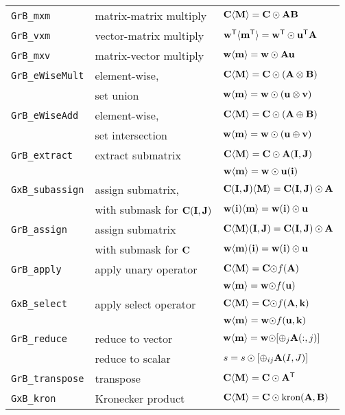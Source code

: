 \documentclass[12pt]{article}
\begin{document}
\vspace{0.2in}
{\small
\begin{tabular}{lll}
\hline
\verb'GrB_mxm'       & matrix-matrix multiply  & ${\bf C \langle M \rangle = C \odot AB}$ \\
\verb'GrB_vxm'       & vector-matrix multiply  & ${\bf w^{\sf T}\langle m^{\sf T}\rangle = w^{\sf T}\odot u^{\sf T}A}$ \\
\verb'GrB_mxv'       & matrix-vector multiply  & ${\bf w \langle m \rangle = w \odot Au}$ \\
\hline
\verb'GrB_eWiseMult' & element-wise,           & ${\bf C \langle M \rangle = C \odot (A \otimes B)}$ \\
                     & set union               & ${\bf w \langle m \rangle = w \odot (u \otimes v)}$ \\
\hline
\verb'GrB_eWiseAdd'  & element-wise,           & ${\bf C \langle M \rangle = C \odot (A \oplus  B)}$ \\
                     & set intersection        & ${\bf w \langle m \rangle = w \odot (u \oplus  v)}$ \\
\hline
\verb'GrB_extract'   & extract submatrix       & ${\bf C \langle M \rangle = C \odot A(I,J)}$ \\
                     &                         & ${\bf w \langle m \rangle = w \odot u(i)}$ \\
\hline
\verb'GxB_subassign' & assign submatrix,       & ${\bf C (I,J) \langle M \rangle = C(I,J) \odot A}$ \\
                     & with submask for ${\bf C(I,J)}$
                                               & ${\bf w (i)   \langle m \rangle = w(i)   \odot u}$ \\
\hline
\verb'GrB_assign'    & assign submatrix        & ${\bf C \langle M \rangle (I,J) = C(I,J) \odot A}$ \\
                     & with submask for ${\bf C}$
                                               & ${\bf w \langle m \rangle (i)   = w(i)   \odot u}$ \\
\hline
\verb'GrB_apply'     & apply unary operator    & ${\bf C \langle M \rangle = C \odot} f{\bf (A)}$ \\
                     &                         & ${\bf w \langle m \rangle = w \odot} f{\bf (u)}$ \\
\hline
\verb'GxB_select'    & apply select operator   & ${\bf C \langle M \rangle = C \odot} f{\bf (A,k)}$ \\
                     &                         & ${\bf w \langle m \rangle = w \odot} f{\bf (u,k)}$ \\
\hline
\verb'GrB_reduce'    & reduce to vector        & ${\bf w \langle m \rangle = w \odot} [{\oplus}_j {\bf A}(:,j)]$ \\
                     & reduce to scalar        & $s = s \odot [{\oplus}_{ij}  {\bf A}(I,J)]$ \\
\hline
\verb'GrB_transpose' & transpose               & ${\bf C \langle M \rangle = C \odot A^{\sf T}}$ \\
\hline
\verb'GxB_kron'      & Kronecker product       & ${\bf C \langle M \rangle = C \odot \mbox{kron}(A, B)}$ \\
\hline
\end{tabular}
}
\end{document}
